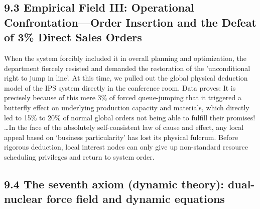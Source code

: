 \documentclass[11pt,a4paper]{article}
\begin{document}
\subsection*{9.3 Empirical Field III: Operational Confrontation—Order Insertion and the Defeat of 3\% Direct Sales Orders}


When the system forcibly included it in overall planning and optimization, the department fiercely resisted and demanded the restoration of the 'unconditional right to jump in line'. At this time, we pulled out the global physical deduction model of the IPS system directly in the conference room. Data proves: It is precisely because of this mere 3\% of forced queue-jumping that it triggered a butterfly effect on underlying production capacity and materials, which directly led to 15\% to 20\% of normal global orders not being able to fulfill their promises! …In the face of the absolutely self-consistent law of cause and effect, any local appeal based on ‘business particularity’ has lost its physical fulcrum. Before rigorous deduction, local interest nodes can only give up non-standard resource scheduling privileges and return to system order.


\subsection*{9.4 The seventh axiom (dynamic theory): dual-nuclear force field and dynamic equations}
\end{document}
